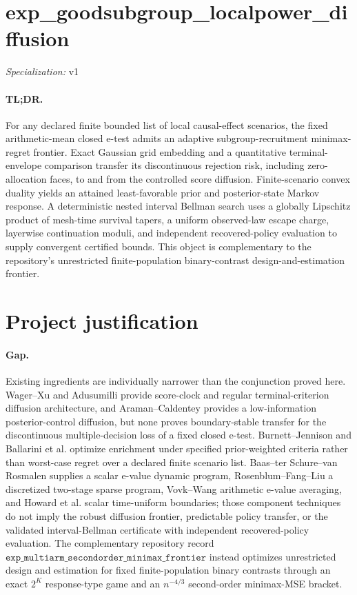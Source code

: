 \documentclass{article}
\begin{document}
\sloppy

\section*{exp\_\allowbreak{}goodsubgroup\_\allowbreak{}localpower\_\allowbreak{}diffusion}

\noindent\textit{Specialization:} v1\par

\paragraph{TL;DR.} For any declared finite bounded list of local causal-effect scenarios, the fixed arithmetic-mean closed e-test admits an adaptive subgroup-recruitment minimax-regret frontier. Exact Gaussian grid embedding and a quantitative terminal-envelope comparison transfer its discontinuous rejection risk, including zero-allocation faces, to and from the controlled score diffusion. Finite-scenario convex duality yields an attained least-favorable prior and posterior-state Markov response. A deterministic nested interval Bellman search uses a globally Lipschitz product of mesh-time survival tapers, a uniform observed-law escape charge, layerwise continuation moduli, and independent recovered-policy evaluation to supply convergent certified bounds. This object is complementary to the repository's unrestricted finite-population binary-contrast design-and-estimation frontier.

\section{Project justification}

\paragraph{Gap.} Existing ingredients are individually narrower than the conjunction proved here. Wager--Xu and Adusumilli provide score-clock and regular terminal-criterion diffusion architecture, and Araman--Caldentey provides a low-information posterior-control diffusion, but none proves boundary-stable transfer for the discontinuous multiple-decision loss of a fixed closed e-test. Burnett--Jennison and Ballarini et al. optimize enrichment under specified prior-weighted criteria rather than worst-case regret over a declared finite scenario list. Baas--ter Schure--van Rosmalen supplies a scalar e-value dynamic program, Rosenblum--Fang--Liu a discretized two-stage sparse program, Vovk--Wang arithmetic e-value averaging, and Howard et al. scalar time-uniform boundaries; those component techniques do not imply the robust diffusion frontier, predictable policy transfer, or the validated interval-Bellman certificate with independent recovered-policy evaluation. The complementary repository record \(\mathtt{exp\_multiarm\_secondorder\_minimax\_frontier}\) instead optimizes unrestricted design and estimation for fixed finite-population binary contrasts through an exact \(2^K\) response-type game and an \(n^{-4/3}\) second-order minimax-MSE bracket.
\end{document}
